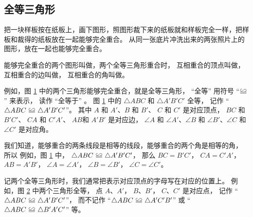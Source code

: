 \subsection{全等三角形}\label{subsec:czjh1-3-4}

把一块样板按在纸板上，画下图形，照图形裁下来的纸板就和样板完全一样，把样板和裁得的纸板放在一起能够完全重合。
从同一张底片冲洗出来的两张照片上的图形，放在一起也能够完全重合。

能够完全重合的两个图形叫做，两个全等三角形重合时，
互相重合的顶点叫做，
互相重合的边叫做，
互相重合的角叫做。

\begin{figure}[htbp]
    \centering
    
    \caption{}\label{fig:czjh1-3-14}
\end{figure}

例如，图 \ref{fig:czjh1-3-14} 中的两个三角形能够完全重合，就是全等三角形，
“全等” 用符号 “$\quandeng$” 来表示， 读作 “全等于” 。
图 \ref{fig:czjh1-3-14} 中的 $\triangle ABC$ 和 $\triangle A'B'C'$ 全等，
记作 “$\triangle ABC \quandeng \triangle A'B'C'$”。
其中 $A$ 和 $A'$、$B$ 和 $B'$、 $C$ 和 $C'$ 是对应顶点，
$BC$ 和 $B'C'$、 $CA$ 和 $C'A'$、 $AB$和 $A'B'$ 是对应边，
$\angle A$ 和 $\angle A'$、$\angle B$ 和 $\angle B'$、$\angle C$ 和 $\angle C'$ 是对应角。

我们知道，能够重合的两条线段是相等的线段，能够重合的两个角是相等的角，
所以
例如，图 \ref{fig:czjh1-3-14} 中， $\triangle ABC \quandeng \triangle A'B'C'$，
那么 $BC = B'C'$， $CA = C'A'$， $AB = A'B'$，
$\angle A = \angle A'$， $\angle B = \angle B'$， $\angle C = \angle C'$。

记两个全等三角形时，我们通常把表示对应顶点的字母写在对应的位置上。
例如，图 \ref{fig:czjh1-3-15} 中两个三角形全等， 点 $A$、$A'$， $B$、$B'$， $C$、$C'$ 是对应点，
记作 “$\triangle ABC \quandeng \triangle A'B'C'$”，
而不记作 “$\triangle ABC \quandeng \triangle A'C'B'$”
或 “$\triangle ABC \quandeng \triangle B'A'C'$” 等。

\begin{figure}[htbp]
    \centering
    
    \caption{}\label{fig:czjh1-3-15}
\end{figure}


